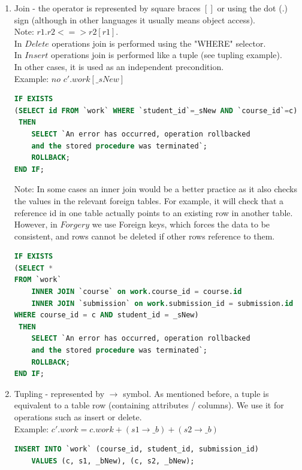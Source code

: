 \documentclass[oneside]{book}
\begin{document}
\begin{enumerate}
\item Join - the operator is represented by square braces $[]$ or using the dot ($.$) sign (although in other languages it usually means object access).\\
Note: $r1.r2 <=> r2 [r1]$.\\
In $Delete$ operations join is performed using the "WHERE" selector.\\
In $Insert$ operations join is performed like a tuple (see tupling example).\\
In other cases, it is used as an independent precondition.\\
Example: $no$ $c'.work [\_sNew]$
\begin{lstlisting}[escapechar=@,language=SQL]
IF EXISTS
(SELECT id FROM `work` WHERE `student_id`=_sNew AND `course_id`=c)
 THEN
	SELECT `An error has occurred, operation rollbacked 
	and the stored procedure was terminated`;
	ROLLBACK;
END IF;
\end{lstlisting}

Note: In some cases an inner join would be a better practice as it also checks the values in the relevant foreign tables. For example, it will check that a reference id in one table actually points to an existing row in another table. However, in $Forgery$ we use Foreign keys, which forces the data to be consistent, and rows cannot be deleted if other rows reference to them.

\begin{lstlisting}[escapechar=@,language=SQL]
IF EXISTS
(SELECT *
FROM `work`
	INNER JOIN `course` on work.course_id = course.id
	INNER JOIN `submission` on work.submission_id = submission.id
WHERE course_id = c AND student_id = _sNew)
 THEN
	SELECT `An error has occurred, operation rollbacked 
	and the stored procedure was terminated`;
	ROLLBACK;
END IF;
\end{lstlisting}

\item Tupling - represented by $\rightarrow$ symbol. As mentioned before, a tuple is equivalent to a table row (containing attributes / columns). We use it for operations such as insert or delete. \\
Example: $c'.work = c.work + (s1 \rightarrow \_b) + (s2 \rightarrow \_b)$

\begin{lstlisting}[escapechar=@,language=SQL]
INSERT INTO `work` (course_id, student_id, submission_id) 
	VALUES (c, s1, _bNew), (c, s2, _bNew);
\end{lstlisting}


\end{enumerate}
\end{document}
